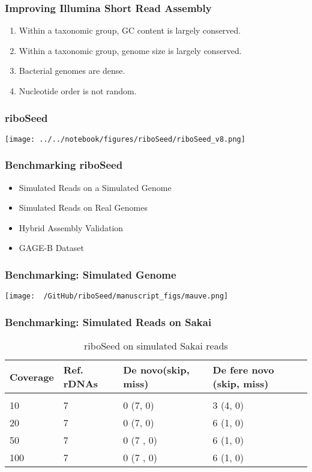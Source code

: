 \documentclass[10pt, compress]{beamer}
\begin{document}
\begin{frame}[fragile]
  \frametitle{Improving Illumina Short Read Assembly}
\begin{enumerate}
\item Within a taxonomic group, GC content is largely conserved.
\item Within a taxonomic group, genome size is largely conserved.
\item Bacterial genomes are dense.
\item Nucleotide order is not random.
\end{enumerate}

\end{frame}

\begin{frame}[fragile]
  \frametitle{riboSeed}
    \texttt{[image: ../../notebook/figures/riboSeed/riboSeed\_v8.png]}\\

\end{frame}


\begin{frame}[fragile]
  \frametitle{Benchmarking riboSeed}
\begin{itemize}
\item Simulated Reads on a Simulated Genome
\item Simulated Reads on Real Genomes
\item Hybrid Assembly Validation
\item GAGE-B Dataset
\end{itemize}

\end{frame}


\begin{frame}[fragile]
  \frametitle{Benchmarking: Simulated Genome}
    \texttt{[image: ~/GitHub/riboSeed/manuscript\_figs/mauve.png]}\\
\end{frame}


\begin{frame}[fragile]
  \frametitle{Benchmarking: Simulated Reads on Sakai}
  \begin{table}[]
\centering
\caption{riboSeed on simulated Sakai reads }
\label{my-label}
\begin{tabular}{llll}
  Coverage &Ref. rDNAs& De novo(skip, miss)&De fere novo (skip, miss) \\
  \hline\\
  10&   7&      0 (7, 0)&	3 (4, 0)\\
  20&	7&	0 (7, 0)&	6 (1, 0)           \\
  50&	7&	0 (7 , 0)&	6 (1, 0)           \\
  100&	7&	0 (7 , 0)&	6 (1, 0)\\
\end{tabular}

\end{table}
\end{frame}
\end{document}
